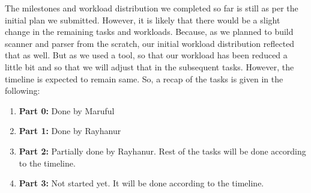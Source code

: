 \documentclass[sigplan, review]{acmart}\settopmatter{printfolios=true,printccs=false,printacmref=false}
\begin{document}
The milestones and workload distribution we completed so far is still as per the initial plan we submitted. However, it is likely that there would be a slight change in the remaining tasks and workloads. Because, as we planned to build scanner and parser from the scratch, our initial workload distribution reflected that as well. But as we used a tool, so that our workload has been reduced a little bit and so that we will adjust that in the subsequent tasks. However, the timeline is expected to remain same. So, a recap of the tasks is given in the following:
\begin{enumerate}
	\item \textbf{Part 0:} Done by Maruful
	\item \textbf{Part 1:} Done by Rayhanur
	\item \textbf{Part 2:} Partially done by Rayhanur. Rest of the tasks will be done according to the timeline. 
	\item \textbf{Part 3:} Not started yet. It will be done according to the timeline.
\end{enumerate} 







%
%
%
%
\end{document}
